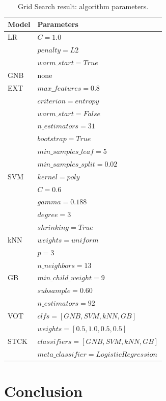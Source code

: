 \begin{table}[h]
\centering
\caption{Grid Search result: algorithm parameters.}
\label{tab:params}
\begin{tabular}{| l | l |}
\hline
Model & Parameters \\ \hline 
LR        & $C=1.0$ \\ 
          & $penalty=L2$ \\
          & $warm\_start=True$ \\ \hline
GNB       & none \\ \hline
EXT       & $max\_features=0.8$ \\ 
          & $criterion=entropy$ \\
          & $warm\_start=False$ \\
          & $n\_estimators=31$ \\
          & $bootstrap=True$ \\
          & $min\_samples\_leaf=5$ \\ 
          & $min\_samples\_split=0.02$ \\ \hline
SVM       & $kernel=poly$ \\
          & $C=0.6$ \\
          & $gamma=0.188$ \\ 
          & $degree=3$ \\
          & $shrinking=True$ \\ \hline
kNN       & $weights=uniform$ \\
          & $p=3$ \\
          & $n\_neighbors=13$ \\ \hline
GB        & $min\_child\_weight=9 $ \\
          & $subsample=0.60$ \\ 
          & $n\_estimators=92$ \\ \hline
VOT       & $clfs=[GNB, SVM, kNN, GB]$ \\
          & $weights=[0.5, 1.0, 0.5, 0.5]$ \\ \hline
STCK      & $classifiers=[GNB, SVM, kNN, GB]$ \\
          & $meta\_classifier=LogisticRegression$ \\          
\hline
\end{tabular}
\end{table}

\section{Conclusion}\label{sec:con}

